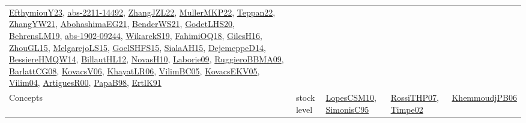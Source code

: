 {\begin{longtable}{lp{3cm}>{\raggedright}p{6cm}>{\raggedright}p{6cm}p{8cm}}
\href{papers/EfthymiouY23.pdf}{EfthymiouY23}\cite{EfthymiouY23}, \href{articles/abs-2211-14492.pdf}{abs-2211-14492}\cite{abs-2211-14492}, \href{papers/ZhangJZL22.pdf}{ZhangJZL22}\cite{ZhangJZL22}, \href{articles/MullerMKP22.pdf}{MullerMKP22}\cite{MullerMKP22}, \href{papers/Teppan22.pdf}{Teppan22}\cite{Teppan22}, \href{articles/ZhangYW21.pdf}{ZhangYW21}\cite{ZhangYW21}, \href{articles/AbohashimaEG21.pdf}{AbohashimaEG21}\cite{AbohashimaEG21}, \href{papers/BenderWS21.pdf}{BenderWS21}\cite{BenderWS21}, \href{papers/GodetLHS20.pdf}{GodetLHS20}\cite{GodetLHS20}, \href{papers/BehrensLM19.pdf}{BehrensLM19}\cite{BehrensLM19}, \href{articles/abs-1902-09244.pdf}{abs-1902-09244}\cite{abs-1902-09244}, \href{articles/WikarekS19.pdf}{WikarekS19}\cite{WikarekS19}, \href{articles/FahimiOQ18.pdf}{FahimiOQ18}\cite{FahimiOQ18}, \href{papers/GilesH16.pdf}{GilesH16}\cite{GilesH16}, \href{papers/ZhouGL15.pdf}{ZhouGL15}\cite{ZhouGL15}, \href{papers/MelgarejoLS15.pdf}{MelgarejoLS15}\cite{MelgarejoLS15}, \href{articles/GoelSHFS15.pdf}{GoelSHFS15}\cite{GoelSHFS15}, \href{papers/SialaAH15.pdf}{SialaAH15}\cite{SialaAH15}, \href{papers/DejemeppeD14.pdf}{DejemeppeD14}\cite{DejemeppeD14}, \href{papers/BessiereHMQW14.pdf}{BessiereHMQW14}\cite{BessiereHMQW14}, \href{papers/BillautHL12.pdf}{BillautHL12}\cite{BillautHL12}, \href{articles/NovasH10.pdf}{NovasH10}\cite{NovasH10}, \href{papers/Laborie09.pdf}{Laborie09}\cite{Laborie09}, \href{articles/RuggieroBBMA09.pdf}{RuggieroBBMA09}\cite{RuggieroBBMA09}, \href{papers/BarlattCG08.pdf}{BarlattCG08}\cite{BarlattCG08}, \href{papers/KovacsV06.pdf}{KovacsV06}\cite{KovacsV06}, \href{articles/KhayatLR06.pdf}{KhayatLR06}\cite{KhayatLR06}, \href{articles/VilimBC05.pdf}{VilimBC05}\cite{VilimBC05}, \href{papers/KovacsEKV05.pdf}{KovacsEKV05}\cite{KovacsEKV05}, \href{papers/Vilim04.pdf}{Vilim04}\cite{Vilim04}, \href{articles/ArtiguesR00.pdf}{ArtiguesR00}\cite{ArtiguesR00}, \href{articles/PapaB98.pdf}{PapaB98}\cite{PapaB98}, \href{papers/ErtlK91.pdf}{ErtlK91}\cite{ErtlK91}\\
Concepts & stock level & \href{articles/LopesCSM10.pdf}{LopesCSM10}\cite{LopesCSM10}, \href{papers/SimonisC95.pdf}{SimonisC95}\cite{SimonisC95} & \href{papers/RossiTHP07.pdf}{RossiTHP07}\cite{RossiTHP07}, \href{articles/Timpe02.pdf}{Timpe02}\cite{Timpe02} & \href{papers/KhemmoudjPB06.pdf}{KhemmoudjPB06}\cite{KhemmoudjPB06}\\

\end{longtable}}
